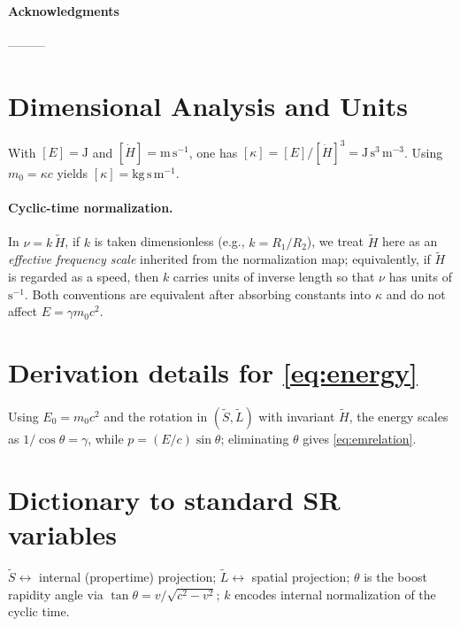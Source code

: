 \documentclass[11pt,a4paper]{article}
\newcommand{\tH}{\tilde{H}}
\newcommand{\tS}{\tilde{S}}
\newcommand{\tL}{\tilde{L}}
\newcommand{\ga}{\gamma}
\begin{document}
\paragraph{Acknowledgments} ———

\appendix
\section{Dimensional Analysis and Units}
With $[E]=\mathrm{J}$ and $[\dot H]=\mathrm{m\,s^{-1}}$, one has $[\kappa]=[E]/[\dot H]^3=\mathrm{J\,s^3\,m^{-3}}$. Using $m_0=\kappa c$ yields $[\kappa]=\mathrm{kg\,s\,m^{-1}}$.

\paragraph{Cyclic-time normalization.} In $\nu= k\,\tH$, if $k$ is taken dimensionless (e.g., $k=R_1/R_2$), we treat $\tH$ here as an \emph{effective frequency scale} inherited from the normalization map; equivalently, if $\tH$ is regarded as a speed, then $k$ carries units of inverse length so that $\nu$ has units of $\mathrm{s^{-1}}$. Both conventions are equivalent after absorbing constants into $\kappa$ and do not affect $E=\gamma m_0 c^2$.

\section{Derivation details for \cref{eq:energy}} 
Using $E_0=m_0 c^2$ and the rotation in $(\tS,\tL)$ with invariant $\tH$, the energy scales as $1/\cos\theta=\ga$, while $p=(E/c)\sin\theta$; eliminating $\theta$ gives \cref{eq:emrelation}.

\section{Dictionary to standard SR variables}
$\tS\leftrightarrow$ internal (proper\textendash time) projection; $\tL\leftrightarrow$ spatial projection; $\theta$ is the boost rapidity angle via $\tan\theta = v/\sqrt{c^2-v^2}$; $k$ encodes internal normalization of the cyclic time.
\end{document}
